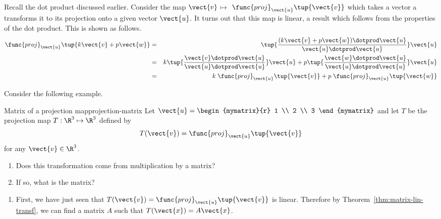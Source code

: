 {Recall the dot product discussed earlier. Consider the map $\vect{v}$\textbf{$\mapsto $}
$\func{proj}_{\vect{u}}\tup{\vect{v}} $ which takes a vector a transforms it to its projection onto a given vector $\vect{u}$. It turns out that
this map is linear, a result which follows from the properties of the
dot product. This is shown as follows.
\begin{eqnarray*}
\func{proj}_{\vect{u}}\tup{k \vect{v}+ p \vect{w}}
&=&\tup{\vspace{0.05in}\frac{(k \vect{v}+ p \vect{w})\dotprod \vect{u}}{
\vect{u}\dotprod \vect{u}}} \vect{u} \\
&=& k  \tup{\vspace{0.05in}\frac{
\vect{v}\dotprod \vect{u}}{\vect{u}\dotprod \vect{u}}} \vect{u}+p \tup{\vspace{
0.05in}\frac{\vect{w}\dotprod \vect{u}}{\vect{u}\dotprod \vect{u}}} \vect{u} \\
&=& k \; \func{proj}_{\vect{u}}\tup{\vect{v}} +p \; \func{proj}
_{\vect{u}}\tup{\vect{w}} 
\end{eqnarray*}

Consider the following example.

\begin{example}{Matrix of a projection map}{projection-matrix}
Let $\vect{u} = \begin{mymatrix}{r}
1 \\
2 \\
3
\end{mymatrix}$ and let $T$ be the projection map $T: \R^3 \mapsto \R^3$ defined by 
\[
T(\vect{v}) = \func{proj}_{\vect{u}}\tup{\vect{v}}
\]
for any $\vect{v} \in \R^3$.  
\begin{enumerate}
\item Does this transformation come from
multiplication by a matrix?
\item If so, what is the matrix?
\end{enumerate}
\end{example}

\begin{solution}
\begin{enumerate}
\item
First, we have just seen that $T (\vect{v}) = \func{proj}_{\vect{u}}\tup{\vect{v}}$ is linear. Therefore by Theorem~\ref{thm:matrix-lin-transf}, we can find a matrix $A$ such that $T(\vect{x}) = A\vect{x}$. 


\end{enumerate}
\end{solution}}

